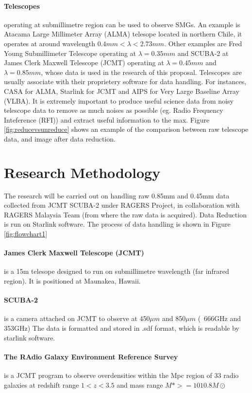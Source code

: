 \documentclass{article}
\begin{document}
\paragraph{Telescopes}operating at submillimetre region can be used to observe SMGs. An example is Atacama Large Millimeter Array (ALMA) telesope located in northern Chile, it operates at around wavelength $ 0.4mm < \lambda < 2.73mm$. Other examples are Fred Young Submillimeter Telescope operating at $\lambda=0.35mm$ and SCUBA-2 at James Clerk Maxwell Telescope (JCMT) operating at $\lambda=0.45mm$ and $\lambda=0.85mm$, whose data is used in the research of this proposal. Telescopes are usually associate with their proprietery software for data handling. For instances, CASA for ALMA, Starlink for JCMT and AIPS for Very Large Baseline Array (VLBA). It is extremely important to produce useful science data from noisy telescope data to remove as much noises as possible (eg. Radio Frequency Inteference (RFI)) and extract useful information to the max. Figure \ref{fig:reducevsunreduce} shows an example of the comparison between raw telescope data, and image after data reduction.

\section{Research Methodology}

The research will be carried out on handling raw 0.85mm and 0.45mm data collected from JCMT SCUBA-2 under RAGERS Project, in collaboration with RAGERS Malaysia Team (from where the raw data is acquired). Data Reduction is run on Starlink software. The process of data handling is shown in Figure \ref{fig:flowchart1}

\paragraph{James Clerk Maxwell Telescope (JCMT)}is a 15m telesope designed to run on submillimetre wavelength (far infrared region). It is positioned at Maunakea, Hawaii.

\paragraph{SCUBA-2}is a camera attached on JCMT to observe at 450$\mu m$ and 850$\mu m$ (~666GHz and 353GHz) The data is formatted and stored in .sdf format, which is readable by starlink software.

\paragraph{The RAdio Galaxy Environment Reference Survey}is a JCMT program to observe overdensities within the Mpc region of 33 radio galaxies at redshift range $1 < z < 3.5$ and mass range $M\ast >=1010.8M\odot $ \cite{Ragers2021}
\end{document}
